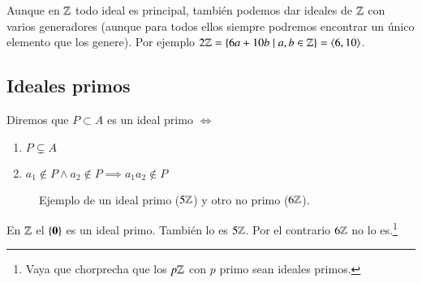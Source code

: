 \begin{ej}
	Aunque en $\mathbb{Z}$ todo ideal es principal, también podemos dar ideales de $\mathbb{Z}$ con varios generadores (aunque para todos ellos siempre podremos encontrar un único elemento que los genere). Por ejemplo $2\mathbb{Z} = \{6a+10b \mid a,b \in \mathbb{Z}\} = \langle6,10\rangle$.
\end{ej}

\subsection{Ideales primos}

\begin{dfn}
	Diremos que $P \subset A$ es un ideal primo $\iff$
	\begin{enumerate}
		\item $P \subsetneq A$
		\item $a_1 \notin P \land a_2 \notin P \implies a_1 a_2 \notin P$
	\end{enumerate}
\end{dfn}

\begin{figure}[h]
	\centering
	\caption{Ejemplo de un ideal primo ($5\mathbb{Z}$) y otro no primo ($6\mathbb{Z}$).}
\end{figure}

\begin{ej}
	En $\mathbb{Z}$ el $\{\mathbf{0}\}$ es un ideal primo. También lo es $5\mathbb{Z}$. Por el contrario $6\mathbb{Z}$ no lo es.\footnote{Vaya que chorprecha que los $p\mathbb{Z}$ con $p$ primo sean ideales primos.}
\end{ej}

